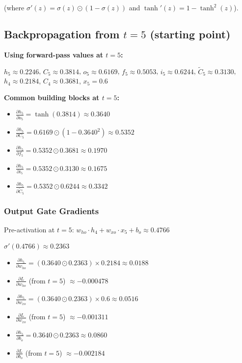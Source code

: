 \documentclass[12pt]{article}
\begin{document}
(where $\sigma'(z) = \sigma(z) \odot (1 - \sigma(z))$ and $\tanh'(z) = 1 - \tanh^2(z)$).

\subsection*{Backpropagation from $t = 5$ (starting point)}

\textbf{Using forward-pass values at $t=5$:}

$h_5 \approx 0.2246$, $C_5 \approx 0.3814$, $o_5 \approx 0.6169$, $f_5 \approx 0.5053$, $i_5 \approx 0.6244$, $\tilde{C}_5 \approx 0.3130$, $h_4 \approx 0.2184$, $C_4 \approx 0.3681$, $x_5 = 0.6$

\textcolor{headingRed}{\textbf{Common building blocks at $t=5$:}}

\begin{itemize}[leftmargin=*]
    \item $\frac{\partial h_5}{\partial o_5} = \tanh(0.3814) \approx 0.3640$
    \item $\frac{\partial h_5}{\partial C_5} = 0.6169 \odot (1 - 0.3640^2) \approx 0.5352$
    \item $\frac{\partial h_5}{\partial f_5} = 0.5352 \odot 0.3681 \approx 0.1970$
    \item $\frac{\partial h_5}{\partial i_5} = 0.5352 \odot 0.3130 \approx 0.1675$
    \item $\frac{\partial h_5}{\partial \tilde{C}_5} = 0.5352 \odot 0.6244 \approx 0.3342$
\end{itemize}

\subsubsection*{Output Gate Gradients}

Pre-activation at $t=5$: $w_{ho} \cdot h_4 + w_{xo} \cdot x_5 + b_o \approx 0.4766$

$\sigma'(0.4766) \approx 0.2363$

\begin{itemize}[leftmargin=*]
    \item $\frac{\partial h_5}{\partial w_{ho}} = (0.3640 \odot 0.2363) \times 0.2184 \approx 0.0188$
    \item $\frac{\partial L}{\partial w_{ho}}$ (from $t=5$) $\approx -0.000478$

    \item $\frac{\partial h_5}{\partial w_{xo}} = (0.3640 \odot 0.2363) \times 0.6 \approx 0.0516$
    \item $\frac{\partial L}{\partial w_{xo}}$ (from $t=5$) $\approx -0.001311$

    \item $\frac{\partial h_5}{\partial b_o} = 0.3640 \odot 0.2363 \approx 0.0860$
    \item $\frac{\partial L}{\partial b_o}$ (from $t=5$) $\approx -0.002184$
\end{itemize}
\end{document}
